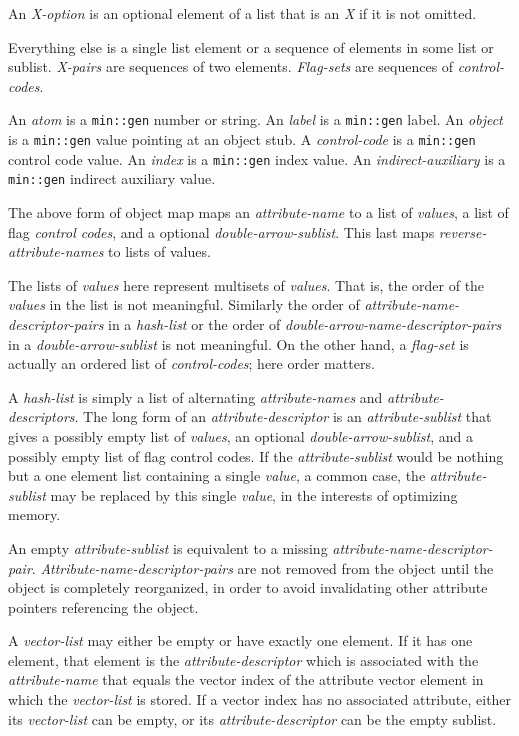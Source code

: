 \documentclass[12pt]{article}
\begin{document}
An {\em X-option} is an optional element of a list that is an {\em X} if
it is not omitted.

Everything else is a single list element or
a sequence of elements in some list or sublist.
{\em X-pairs} are sequences of two elements.
{\em Flag-sets} are sequences of {\em control-codes}.

An {\em atom} is a \verb|min::gen| number or string.
An {\em label} is a \verb|min::gen| label.
An {\em object} is a \verb|min::gen| value pointing at an object stub.
A {\em control-code} is a \verb|min::gen| control code value.
An {\em index} is a \verb|min::gen| index value.
An {\em indirect-auxiliary} is a \verb|min::gen| indirect auxiliary value.

The above form of object map maps an {\em attribute-name} to a list of
{\em values}, a list of flag {\em control codes}, and a optional
{\em double-arrow-sublist}.  This last maps {\em reverse-attribute-names}
to lists of values.

The lists of {\em values} here represent multisets of {\em values}.
That is, the
order of the {\em values} in the list is not meaningful.
Similarly the order of {\em attribute-name-descriptor-pairs}
in a {\em hash-list}
or the order of {\em double-arrow-name-descriptor-pairs}
in a {\em double-arrow-sublist} is not meaningful.
On the other hand, a {\em flag-set} is actually an ordered list
of {\em control-codes}; here order matters.

A {\em hash-list} is simply a list of alternating {\em attribute-names}
and {\em attribute-descriptors}.
The long form of an {\em attribute-descriptor} is an
{\em attribute-sublist} that gives  a possibly empty list of {\em values},
an optional {\em double-arrow-sublist}, and a possibly empty
list of flag control codes.
If the {\em attribute-sublist}
would be nothing but a one element list containing
a single {\em value}, a common case, the {\em attribute-sublist}
may be replaced by this single
{\em value}, in the interests of optimizing memory.

An empty {\em attribute-sublist} is equivalent to a missing
{\em attribute-name-descriptor-pair}.
{\em Attri\-bute-name-descriptor-pairs} are not
removed from the object until the object is completely reorganized,
in order to avoid invalidating other attribute pointers referencing the object.

A {\em vector-list} may either be empty or have exactly one element.
If it has one element, that element is
the {\em attribute-descriptor} which is associated with the
{\em attribute-name} that equals the vector index of the
attribute vector element in which the {\em vector-list} is stored.
If a vector index has no associated attribute, either its
{\em vector-list} can be empty, or its
{\em attribute-descriptor} can be the empty sublist.
\end{document}
